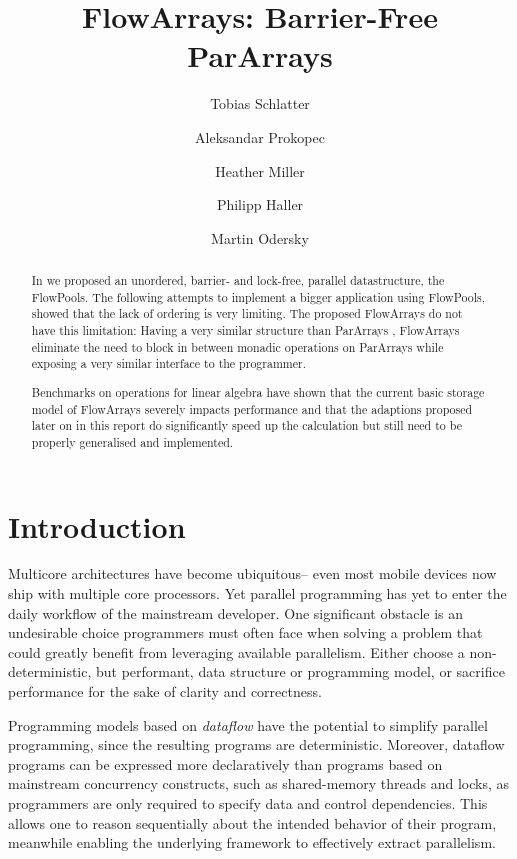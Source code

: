 \documentclass[runningheads,a4paper,fleqn]{llncs}
\begin{document}
\title{FlowArrays: Barrier-Free ParArrays}
\author{Tobias Schlatter \and Aleksandar Prokopec \and
  Heather Miller \and Philipp Haller \and Martin
  Odersky}



\graphicspath{{figs/}}

\newcommand{\plot}[1]{}

\maketitle

\begin{abstract}
  In \cite{FP12} we proposed an unordered, barrier- and lock-free,
  parallel datastructure, the FlowPools. The following attempts to
  implement a bigger application using FlowPools, showed that the lack
  of ordering is very limiting. The proposed FlowArrays do not have
  this limitation: Having a very similar structure than ParArrays
  \cite{collect11}, FlowArrays eliminate the need to block in between
  monadic operations on ParArrays while exposing a very similar
  interface to the programmer.

  Benchmarks on operations for linear algebra have shown that the
  current basic storage model of FlowArrays severely impacts
  performance and that the adaptions proposed later on in this report
  do significantly speed up the calculation but still need to be
  properly generalised and implemented.
\end{abstract}

\section{Introduction}
Multicore architectures have become ubiquitous-- even most mobile devices now
ship with multiple core processors. Yet parallel programming has yet to enter
the daily workflow of the mainstream developer. One significant obstacle is an
undesirable choice programmers must often face when solving a problem that
could greatly benefit from leveraging available parallelism. Either choose a
non-deterministic, but performant, data structure or programming model, or
sacrifice performance for the sake of clarity and correctness.

Programming models based on \emph{dataflow} \cite{Arvind89,CnC10} have the
potential to simplify parallel programming, since the resulting programs are
deterministic. Moreover, dataflow programs can be expressed more declaratively
than programs based on mainstream concurrency constructs, such as shared-memory 
threads and locks, as programmers are only required to specify data and
control dependencies. This allows one to reason sequentially about the
intended behavior of their program, meanwhile enabling the underlying
framework to effectively extract parallelism.
\end{document}
